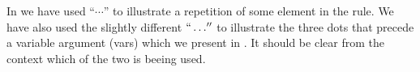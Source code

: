 In  we have used ``$\cdots$'' to illustrate a repetition
of some element in the rule. We have also used the slightly different
$``\dots''$ to illustrate the three dots that precede a variable argument (vars)
which we present in . It should be clear from the context which of the
two is beeing used.

